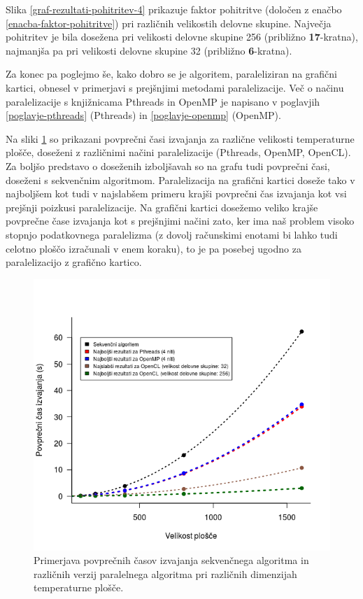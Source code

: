 \documentclass[a4paper,titlepage,11pt]{article}
\begin{document}
Slika \ref{graf-rezultati-pohitritev-4} prikazuje faktor pohitritve (določen z enačbo \ref{enacba-faktor-pohitritve}) pri različnih velikostih delovne skupine. Največja pohitritev je bila dosežena pri velikosti delovne skupine 256 (približno \textbf{17}-kratna), najmanjša pa pri velikosti delovne skupine 32 (približno \textbf{6}-kratna).

Za konec pa poglejmo še, kako dobro se je algoritem, paraleliziran na grafični kartici, obnesel v primerjavi s prejšnjimi metodami paralelizacije. Več o načinu paralelizacije s knjižnicama Pthreads in OpenMP je napisano v poglavjih \ref{poglavje-pthreads} (Pthreads) in \ref{poglavje-openmp} (OpenMP).

Na sliki \ref{graf-rezultati-primerjava-4} so prikazani povprečni časi izvajanja za različne velikosti temperaturne plošče, doseženi z različnimi načini paralelizacije (Pthreads, OpenMP, OpenCL). Za boljšo predstavo o doseženih izboljšavah so na grafu tudi povprečni časi, doseženi s sekvenčnim algoritmom. Paralelizacija na grafični kartici doseže tako v najboljšem kot tudi v najslabšem primeru krajši povprečni čas izvajanja kot vsi prejšnji poizkusi paralelizacije. Na grafični kartici dosežemo veliko krajše povprečne čase izvajanja kot s prejšnjimi načini zato, ker ima naš problem visoko stopnjo podatkovnega paralelizma (z dovolj računskimi enotami bi lahko tudi celotno ploščo izračunali v enem koraku), to je pa posebej ugodno za paralelizacijo z grafično kartico.

\begin{figure}[H]
\begin{center}
\includegraphics[scale=0.7]{graf-rezultati-4_1_1.png}
\caption{Primerjava povprečnih časov izvajanja sekvenčnega algoritma in različnih verzij paralelnega algoritma pri različnih dimenzijah temperaturne plošče.}
\label{graf-rezultati-primerjava-4}
\end{center}
\vspace{-25pt}
\end{figure}
\end{document}
